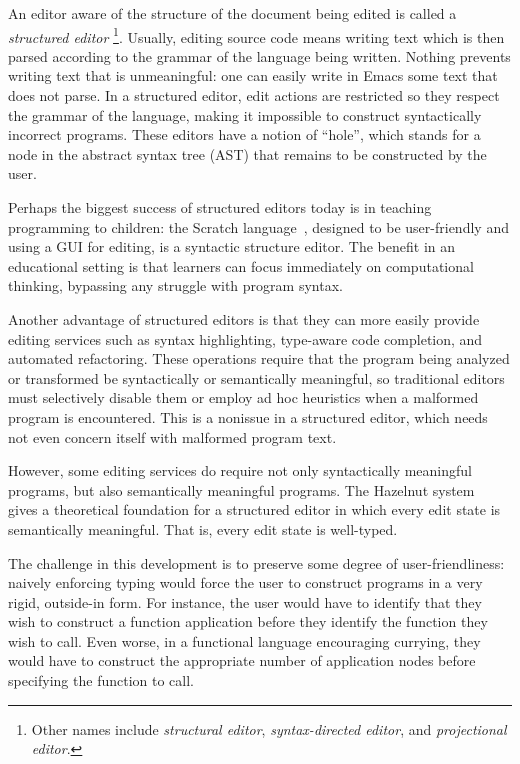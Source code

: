 An editor aware of the structure of the document being edited is called a
\emph{structured editor}%
\footnote{%
  Other names include \emph{structural editor}, \emph{syntax-directed editor},
  and \emph{projectional editor}.%
}.
Usually, editing source code means writing text which is then parsed according
to the grammar of the language being written.
Nothing prevents writing text that is unmeaningful: one can easily write in
Emacs some text that does not parse.
In a structured editor, edit actions are restricted so they respect the grammar
of the language, making it impossible to construct syntactically incorrect
programs.
These editors have a notion of ``hole'', which stands for a node in the abstract
syntax tree (AST) that remains to be constructed by the user.

Perhaps the biggest success of structured editors today is in teaching
programming to children: the Scratch language~\cite{scratch}, designed to be
user-friendly and using a GUI for editing, is a syntactic structure editor.
The benefit in an educational setting is that learners can focus immediately on
computational thinking, bypassing any struggle with program syntax.

Another advantage of structured editors is that they can more easily provide
editing services such as syntax highlighting, type-aware code completion, and
automated refactoring.
These operations require that the program being analyzed or transformed be
syntactically or semantically meaningful, so traditional editors must
selectively disable them or employ ad hoc heuristics when a malformed program is
encountered.
This is a nonissue in a structured editor, which needs not even concern itself
with malformed program text.

However, some editing services do require not only syntactically meaningful
programs, but also semantically meaningful programs.
The Hazelnut system~\cite{hazelnut} gives a theoretical foundation for a
structured editor in which every edit state is semantically meaningful.
That is, every edit state is well-typed.

The challenge in this development is to preserve some degree of
user-friendliness: naively enforcing typing would force the user to construct
programs in a very rigid, outside-in form.
For instance, the user would have to identify that they wish to construct a
function application before they identify the function they wish to
call.
Even worse, in a functional language encouraging currying, they would have to
construct the appropriate number of application nodes before specifying the
function to call.

